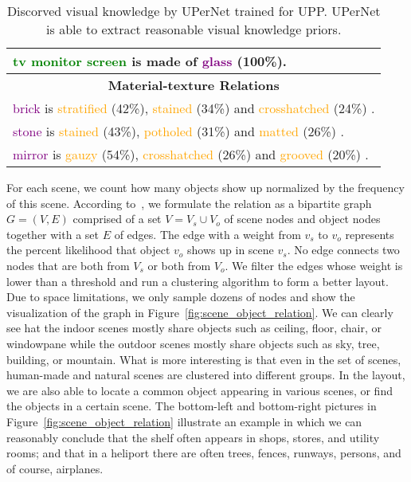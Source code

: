\documentclass[runningheads]{llncs}
\begin{document}
\begin{table*}[!ht]
\begin{center}
{\begin{tabular}{l}
\textcolor{green}{tv monitor screen} is made of \textcolor{purple}{glass} (100\%).\\

\hline

\multicolumn{1}{c}{\textbf{Material-texture Relations}} \\
\textcolor{purple}{brick} is \textcolor{orange}{stratified} (42\%), \textcolor{orange}{stained} (34\%) and \textcolor{orange}{crosshatched} (24\%) . \\

\textcolor{purple}{stone} is \textcolor{orange}{stained} (43\%), \textcolor{orange}{potholed} (31\%) and \textcolor{orange}{matted} (26\%) . \\

\textcolor{purple}{mirror} is \textcolor{orange}{gauzy} (54\%), \textcolor{orange}{crosshatched} (26\%) and \textcolor{orange}{grooved} (20\%) . \\
\bottomrule[0.8pt]
\end{tabular}}
\end{center}
\caption{Discorved visual knowledge by UPerNet trained for UPP. UPerNet is able to extract reasonable visual knowledge priors.}
\label{tab:auto_generation}
\end{table*}



 For each scene, we count how many objects show up normalized by the frequency of this scene. According to~\cite{brandes2013network}, we formulate the relation as a bipartite graph $G=(V, E)$ comprised of a set $V=V_s \cup V_o$ of scene nodes and object nodes together with a set $E$ of edges. The edge with a weight from $v_s$ to $v_o$ represents the percent likelihood that object $v_o$ shows up in scene $v_s$. No edge connects two nodes that are both from $V_s$ or both from $V_o$. We filter the edges whose weight is lower than a threshold and run a clustering algorithm to form a better layout. Due to space limitations, we only sample dozens of nodes and show the visualization of the graph in Figure~\ref{fig:scene_object_relation}. We can clearly see hat the indoor scenes mostly share objects such as ceiling, floor, chair, or windowpane while the outdoor scenes mostly share objects such as sky, tree, building, or mountain. What is more interesting is that even in the set of scenes, human-made and natural scenes are clustered into different groups. In the layout, we are also able to locate a common object appearing in various scenes, or find the objects in a certain scene. The bottom-left and bottom-right pictures in Figure~\ref{fig:scene_object_relation} illustrate an example in which we can reasonably conclude that the shelf often appears in shops, stores, and utility rooms; and that in a heliport there are often trees, fences, runways, persons, and of course, airplanes.
\end{document}
